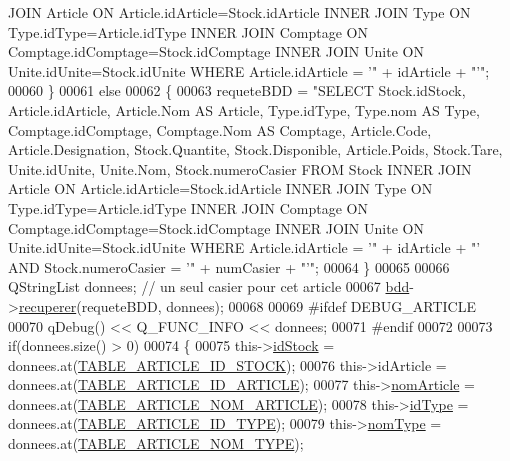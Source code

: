 \begin{DoxyCode}
{       JOIN Article ON Article.idArticle=Stock.idArticle INNER JOIN Type ON Type.idType=Article.idType INNER JOIN
       Comptage ON Comptage.idComptage=Stock.idComptage INNER JOIN Unite ON Unite.idUnite=Stock.idUnite WHERE
       Article.idArticle = '"} + idArticle + \textcolor{stringliteral}{"'"};
00060     \}
00061     \textcolor{keywordflow}{else}
00062     \{
00063         requeteBDD = \textcolor{stringliteral}{"SELECT Stock.idStock, Article.idArticle, Article.Nom AS Article, Type.idType,
       Type.nom AS Type, Comptage.idComptage, Comptage.Nom AS Comptage, Article.Code, Article.Designation, Stock.Quantite,
       Stock.Disponible, Article.Poids, Stock.Tare, Unite.idUnite, Unite.Nom, Stock.numeroCasier FROM Stock INNER
       JOIN Article ON Article.idArticle=Stock.idArticle INNER JOIN Type ON Type.idType=Article.idType INNER JOIN
       Comptage ON Comptage.idComptage=Stock.idComptage INNER JOIN Unite ON Unite.idUnite=Stock.idUnite WHERE
       Article.idArticle = '"} + idArticle + \textcolor{stringliteral}{"' AND Stock.numeroCasier = '"} + numCasier + \textcolor{stringliteral}{"'"};
00064     \}
00065 
00066     QStringList donnees; \textcolor{comment}{// un seul casier pour cet article}
00067     \hyperlink{class_article_a7221cec4212d86d74f479b9ee683ee8a}{bdd}->\hyperlink{class_bdd_a8f25d29d309041bbf875700db0efd97b}{recuperer}(requeteBDD, donnees);
00068 
00069 \textcolor{preprocessor}{    #ifdef DEBUG\_ARTICLE}
00070         qDebug() << Q\_FUNC\_INFO << donnees;
00071 \textcolor{preprocessor}{    #endif}
00072 
00073     \textcolor{keywordflow}{if}(donnees.size() > 0)
00074     \{
00075         this->\hyperlink{class_article_afb7785930598d5fbdafb707acdd3eec1}{idStock} = donnees.at(\hyperlink{_article_8h_a159354683cfd6e1b578172fbe6490ab6acfb8962aaa35363f43d27a9f6f1ae265}{TABLE\_ARTICLE\_ID\_STOCK});
00076         this->idArticle = donnees.at(\hyperlink{_article_8h_a159354683cfd6e1b578172fbe6490ab6a9282e68cff8aecde470ad5004f0e5ebb}{TABLE\_ARTICLE\_ID\_ARTICLE});
00077         this->\hyperlink{class_article_a0ba6c08f7dd54e4b7caf673ecd6b41a6}{nomArticle} = donnees.at(\hyperlink{_article_8h_a159354683cfd6e1b578172fbe6490ab6a7a309a358c54f9ea482a222d0cb4d135}{TABLE\_ARTICLE\_NOM\_ARTICLE});
00078         this->\hyperlink{class_article_a1586203d0eb334a3298ca719f924083d}{idType} = donnees.at(\hyperlink{_article_8h_a159354683cfd6e1b578172fbe6490ab6a57d25aaddbe360d849497b01b865599c}{TABLE\_ARTICLE\_ID\_TYPE});
00079         this->\hyperlink{class_article_a06489a7445495277e44c7179b7cf8bbc}{nomType} = donnees.at(\hyperlink{_article_8h_a159354683cfd6e1b578172fbe6490ab6a7644b9669e82ebdf66baef0dff84f46c}{TABLE\_ARTICLE\_NOM\_TYPE});

\end{DoxyCode}
